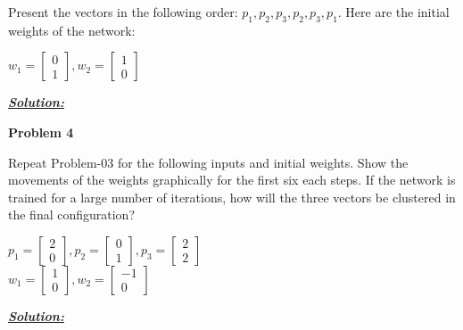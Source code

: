 \documentclass{article}
\begin{document}
\noindent Present the vectors in the following order: $p_1, p_2, p_3, p_2, p_3, p_1$. 
Here are the initial weights of the network: 

\begin{center}
    $w_1 = \begin{bmatrix}
        0\\
        1
      \end{bmatrix}, w_2 = \begin{bmatrix}
        1\\
        0
      \end{bmatrix}$
      \vspace{1cm}
\end{center}

\noindent \underline{\textbf{\textit{Solution:}}}


\newpage
\noindent \textbf{Problem 4}

\noindent Repeat Problem-03 for the following inputs and initial weights. Show the movements of 
the weights graphically for the first six each steps. If the network is trained for a large 
number of iterations, how will the three vectors be clustered in the final configuration?

\begin{center}
    $p_1 = \begin{bmatrix}
        2\\
        0
      \end{bmatrix}, p_2 = \begin{bmatrix}
        0\\
        1
      \end{bmatrix}, p_3 = \begin{bmatrix}
        2\\
        2
      \end{bmatrix}$\\
      \vspace{1cm}
      $w_1 = \begin{bmatrix}
        1\\
        0
      \end{bmatrix}, w_2 = \begin{bmatrix}
        -1\\
        0
      \end{bmatrix}$
      \vspace{1cm}

\end{center}

\noindent \underline{\textbf{\textit{Solution:}}}
\end{document}
